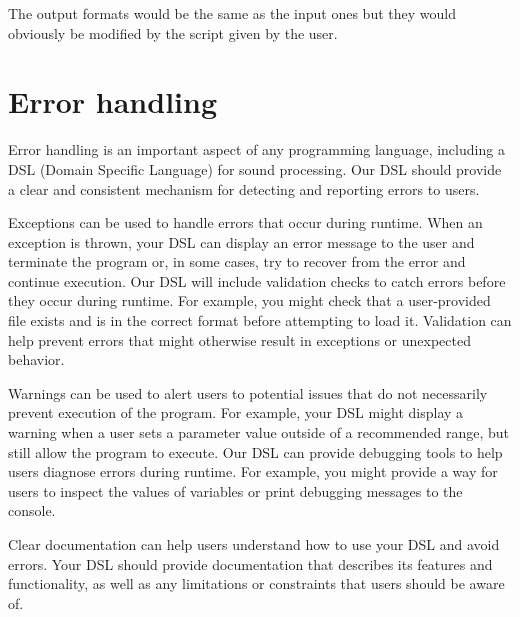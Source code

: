 The output formats would be the same as the input ones but they 
would obviously be modified by the script given by the user.

\section{Error handling}
Error handling is an important aspect of any programming language, 
including a DSL (Domain Specific Language) for sound processing. 
Our DSL should provide a clear and consistent mechanism for 
detecting and reporting errors to users.

Exceptions can be used to handle errors that occur during runtime. 
When an exception is thrown, your DSL can display an error message 
to the user and terminate the program or, in some cases, try to 
recover from the error and continue execution.
Our DSL will include validation checks to catch errors before they 
occur during runtime. For 
example, you might check that a user-provided file exists and is in 
the correct format before attempting to load it. Validation can 
help prevent errors that might otherwise result in exceptions or 
unexpected behavior.

Warnings can be used to alert users to potential issues that do not 
necessarily prevent execution of the program. For example, your DSL 
might display a warning when a user sets a parameter value outside 
of a recommended range, but still allow the program to execute.
Our DSL can provide debugging tools to help users diagnose errors 
during runtime. For example, you might provide a way for users to 
inspect the values of variables or print debugging messages to the 
console.

Clear documentation can help users understand how to use your DSL 
and avoid errors. Your DSL should provide documentation that 
describes its features and functionality, as well as any 
limitations or constraints that users should be aware of.
